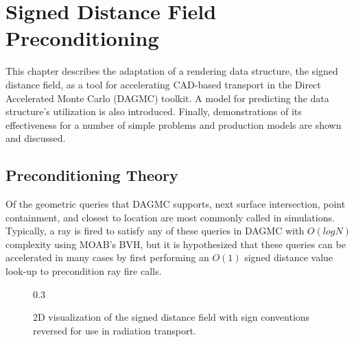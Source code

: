 

\newcommand{\precondQuery}[4] {
  \null %
  \textbf{\uppercase{#1}} 
  \begin{adjustwidth}{1em}{0pt}
    \begin{figure}[H]
      \label{fig:#2}
      \begin{center}
        {0.7\textwidth}
        \caption{#3}
      \end{center}
    \end{figure}
    #4
  \end{adjustwidth}
}

\chapter{Signed Distance Field Preconditioning}\label{ch:preconditioning}

This chapter describes the adaptation of a rendering data structure, the signed
distance field, as a tool for accelerating CAD-based transport in the Direct
Accelerated Monte Carlo (DAGMC) toolkit. A model for predicting the data
structure's utilization is also introduced. Finally, demonstrations of its
effectiveness for a number of simple problems and production models are shown
and discussed.

\section{Preconditioning Theory}\label{section:preconditioner_theory}

Of the geometric queries that DAGMC supports, next surface intersection, point
containment, and closest to location are most commonly called in simulations.
Typically, a ray is fired to satisfy any of these queries in DAGMC with
$O(logN)$ complexity using MOAB's BVH, but it is hypothesized that these queries
can be accelerated in many cases by first performing an $O(1)$ signed distance
value look-up to precondition ray fire calls.

\begin{figure}[ht]
  {0.3\textwidth}
  \centering
  \caption{2D visualization of the signed distance field with sign conventions
    reversed for use in radiation transport.}
  \label{fig:preconditioner_datastruct}
\end{figure}


